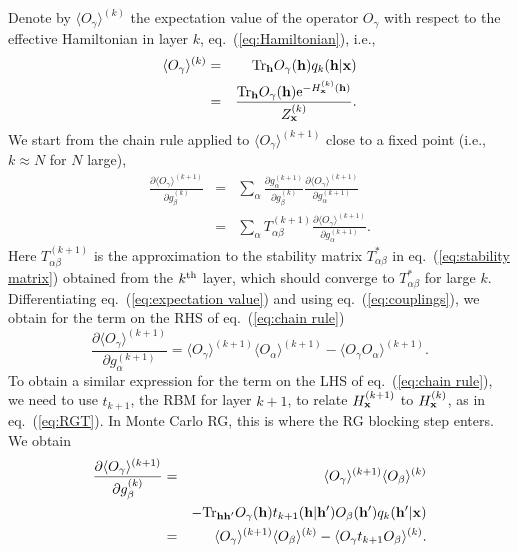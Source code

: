 \documentclass[reprint,amsmath,amssymb,aps]{revtex4-1}
\begin{document}
Denote by $\langle O_\gamma\rangle^{(k)}$ the expectation value of the operator $O_\gamma$ with respect to the effective Hamiltonian in layer $k$, eq.~(\ref{eq:Hamiltonian}), i.e.,
\begin{eqnarray}
\langle O_\gamma\rangle^{(k)} &=& {\rm Tr}_{\bf h} O_\gamma({\bf h}) q_k({\bf h}|{\bf x}) \nonumber\\
                              &=& \frac{{\rm Tr}_{\bf h} O_\gamma({\bf h}){\rm e}^{-H^{(k)}_{\bf x}({\bf h})}}{Z^{(k)}_{\bf x}}.
\label{eq:expectation value}
\end{eqnarray}
We start from the chain rule applied to $\langle O_\gamma\rangle^{(k+1)}$ close to a fixed point (i.e., $k\approx N$ for $N$ large),
\begin{eqnarray}
\frac{\partial \langle O_\gamma\rangle^{(k+1)}}{\partial g^{(k)}_\beta}  &=& \sum_\alpha{\frac{\partial g^{(k+1)}_\alpha}{\partial g^{(k)}_\beta}\frac{\partial \langle O_\gamma\rangle^{(k+1)}}{\partial g^{(k+1)}_\alpha}} \nonumber\\
&=& \sum_\alpha{T^{(k+1)}_{\alpha\beta}\frac{\partial \langle O_\gamma\rangle^{(k+1)}}{\partial g^{(k+1)}_\alpha} }.
\label{eq:chain rule}
\end{eqnarray}
Here $T^{(k+1)}_{\alpha\beta}$ is the approximation to the stability matrix $T^*_{\alpha\beta}$ in eq.~(\ref{eq:stability matrix}) obtained from the $k^{\rm th}$ layer, which should converge to $T^*_{\alpha\beta}$ for large $k$. Differentiating eq.~(\ref{eq:expectation value}) and using eq.~(\ref{eq:couplings}), we obtain for the term on the RHS of eq.~(\ref{eq:chain rule})
\begin{equation}
\frac{\partial \langle O_\gamma\rangle^{(k+1)}}{\partial g^{(k+1)}_\alpha} = \langle O_\gamma\rangle^{(k+1)}\langle O_\alpha\rangle^{(k+1)} - \langle O_\gamma O_\alpha\rangle^{(k+1)}.
\label{eq:in-layer correlations}
\end{equation}
To obtain a similar expression for the term on the LHS of eq.~(\ref{eq:chain rule}), we need to use $t_{k+1}$, the RBM for layer $k+1$, to relate $H^{(k+1)}_{\bf x}$ to $H^{(k)}_{\bf x}$, as in eq.~(\ref{eq:RGT}). In Monte Carlo RG, this is where the RG blocking step enters. We obtain
\begin{eqnarray}
\frac{\partial \langle O_\gamma\rangle^{(k+1)}}{\partial g^{(k)}_\beta} &=& \langle O_\gamma\rangle^{(k+1)}\langle O_\beta\rangle^{(k)} \nonumber\\
&& - {\rm Tr}_{{\bf hh}'} O_\gamma({\bf h}) t_{k+1}({\bf h}|{\bf h}') O_\beta({\bf h}') q_k({\bf h}'|{\bf x}) \nonumber\\
&=& \langle O_\gamma\rangle^{(k+1)}\langle O_\beta\rangle^{(k)} - \langle O_\gamma t_{k+1} O_\beta\rangle^{(k)}.\nonumber\\
&&
\label{eq:between-layer correlations}
\end{eqnarray}
\end{document}
